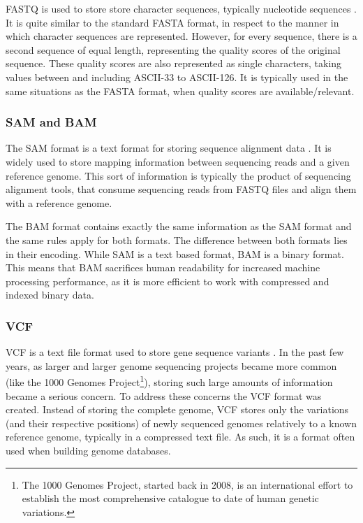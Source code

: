 FASTQ is used to store store character sequences, typically nucleotide sequences
\cite{Cock2010}. It is quite similar to the standard FASTA format, in respect to
the manner in which character sequences are represented. However, for every
sequence, there is a second sequence of equal length, representing the quality
scores of the original sequence. These quality scores are also represented as
single characters, taking values between and including ASCII-33 to ASCII-126.
It is typically used in the same situations as the FASTA format, when quality
scores are available/relevant.

\subsubsection*{SAM and BAM}

The SAM format is a text format for storing sequence alignment data
\cite{genome:sam}. It is widely used to store mapping information between
sequencing reads and a given reference genome. This sort of information is
typically the product of sequencing alignment tools, that consume sequencing
reads from FASTQ files and align them with a reference genome.

The BAM format contains exactly the same information as the SAM format and the
same rules apply for both formats. The difference between both formats lies in
their encoding. While SAM is a text based format, BAM is a binary format. This
means that BAM sacrifices human readability for increased machine processing
performance, as it is more efficient to work with compressed and indexed binary
data.

\subsubsection*{VCF}

VCF is a text file format used to store gene sequence variants \cite{smith13}.
In the past few years, as larger and larger genome sequencing projects became
more common (like the 1000 Genomes Project\footnote{The 1000 Genomes Project,
started back in 2008, is an international effort to establish the most
comprehensive catalogue to date of human genetic variations.}), storing such
large amounts of information became a serious concern. To address these concerns
the VCF format was created. Instead of storing the complete genome, VCF stores
only the variations (and their respective positions) of newly sequenced genomes
relatively to a known reference genome, typically in a compressed text file. As
such, it is a format often used when building genome databases.

